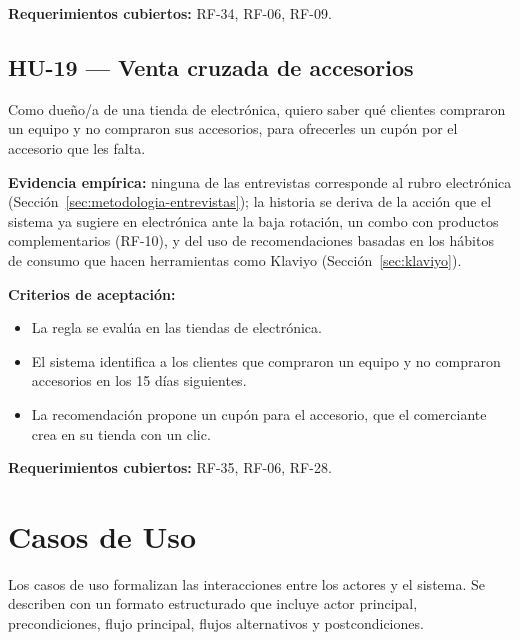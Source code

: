 \noindent\textbf{Requerimientos cubiertos:} RF-34, RF-06, RF-09.

\subsection{HU-19 --- Venta cruzada de accesorios}
\label{sec:hu-19}

Como dueño/a de una tienda de electrónica, quiero saber qué clientes compraron un equipo y no compraron sus accesorios, para ofrecerles un cupón por el accesorio que les falta.

\noindent\textbf{Evidencia empírica:} ninguna de las entrevistas corresponde al rubro electrónica (Sección~\ref{sec:metodologia-entrevistas}); la historia se deriva de la acción que el sistema ya sugiere en electrónica ante la baja rotación, un combo con productos complementarios (RF-10), y del uso de recomendaciones basadas en los hábitos de consumo que hacen herramientas como Klaviyo (Sección~\ref{sec:klaviyo}).

\noindent\textbf{Criterios de aceptación:}
\begin{itemize}
    \item La regla se evalúa en las tiendas de electrónica.
    \item El sistema identifica a los clientes que compraron un equipo y no compraron accesorios en los 15 días siguientes.
    \item La recomendación propone un cupón para el accesorio, que el comerciante crea en su tienda con un clic.
\end{itemize}

\noindent\textbf{Requerimientos cubiertos:} RF-35, RF-06, RF-28.

\section{Casos de Uso}
\label{sec:casos-uso}

Los casos de uso formalizan las interacciones entre los actores y el sistema. Se describen con un formato estructurado que incluye actor principal, precondiciones, flujo principal, flujos alternativos y postcondiciones.

